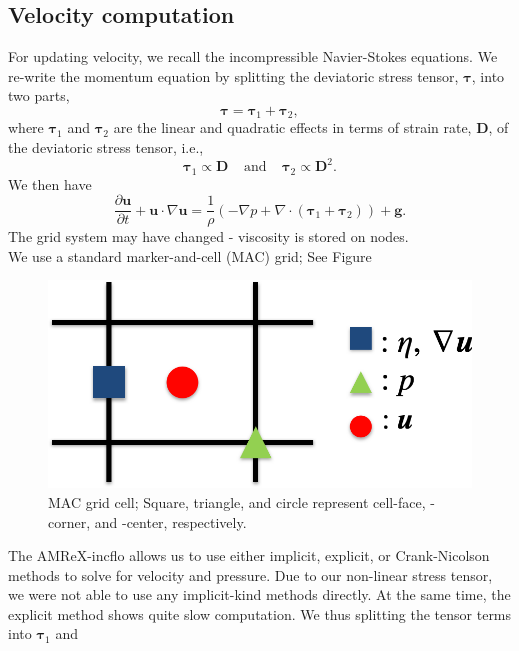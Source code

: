 \subsection{Velocity computation}
For updating velocity, we recall the incompressible Navier-Stokes equations. We re-write the momentum equation by splitting the deviatoric stress tensor, ${\bm \tau}$, into two parts, 
\[
 {\bm \tau}= {\bm \tau_1} + {\bm \tau_2},
\] 
where ${\bm \tau_1}$ and ${\bm \tau_2}$ are the linear and quadratic effects in terms of strain rate, ${\bm D}$, of the deviatoric stress tensor, i.e., 
\[
  {\boldsymbol \tau_1} \propto \boldsymbol{D}
  \ \ \ \ \ \text{and}
   \ \ \ \ \ 
{\boldsymbol \tau_2} \propto {\boldsymbol D^2}.
\]
We then have
\begin{equation}
  \frac{\partial {\bm u}}{\partial t} 
  + {\bm u} \cdot \nabla {\bm u} = \frac{1}{\rho}
  \left( 
    -\nabla p + \nabla \cdot \left( {\bm \tau_1} + {\bm \tau_2} \right)\right) + {\bm g}.
  \label{eq_momentum2}
\end{equation}
{\color{red} The grid system may have changed - viscosity is stored on nodes.}
\\
We use a standard marker-and-cell (MAC) grid; See Figure 
\begin{figure}[ht]
	\begin{center}
	
		\includegraphics[scale=0.5]{figures/fig_mac_grid.png}
		\caption{MAC grid cell; Square, triangle, and circle represent cell-face, -corner, and -center, respectively.}
	\label{fig_mac_grid}
	\end{center}
\end{figure}
The AMReX-incflo allows us to use either implicit, explicit, or Crank-Nicolson methods to solve for velocity and pressure. Due to our non-linear stress tensor, we were not able to use any implicit-kind methods directly. At the same time, the explicit method shows quite slow computation. We thus splitting the tensor terms into ${\bm \tau_1}$ and
